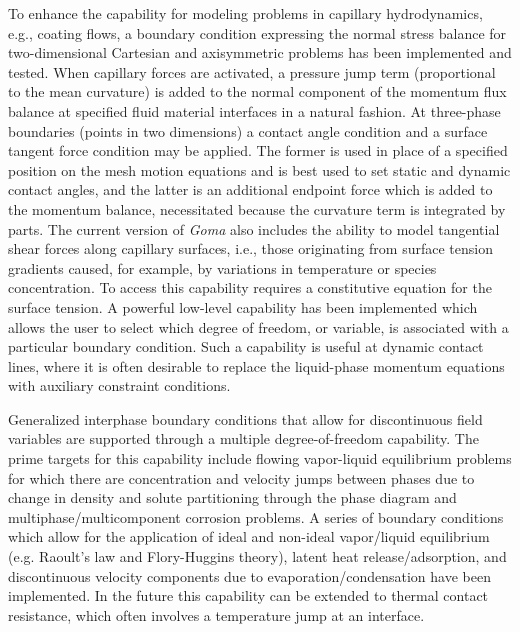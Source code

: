 To enhance the capability for modeling problems in capillary hydrodynamics, e.g., coating flows, a boundary condition expressing the normal stress balance for two-dimensional Cartesian and axisymmetric problems has been implemented and tested. When capillary forces are activated, a pressure jump term (proportional to the mean curvature) is added to the normal component of the momentum flux balance at specified fluid material interfaces in a natural fashion. At three-phase boundaries (points in two dimensions) a contact angle condition and a surface tangent force condition may be applied. The former is used in place of a specified position on the mesh motion equations and is best used to set static and dynamic contact angles, and the latter is an additional endpoint force which is added to the momentum balance, necessitated because the curvature term is integrated by parts. The current version of \emph{Goma} also includes the ability to model tangential shear forces along capillary surfaces, i.e., those originating from surface tension gradients caused, for example, by variations in temperature or species concentration. To access this capability requires a constitutive equation for the surface tension. A powerful low-level capability has been implemented which allows the user to select which degree of freedom, or variable, is associated with a particular boundary condition. Such a capability is useful at dynamic contact lines, where it is often desirable to replace the liquid-phase momentum equations with auxiliary constraint conditions.

Generalized interphase boundary conditions that allow for discontinuous field variables are supported through a multiple degree-of-freedom capability. The prime targets for this capability include flowing vapor-liquid equilibrium problems for which there are concentration and velocity jumps between phases due to change in density and solute partitioning through the phase diagram and multiphase/multicomponent corrosion problems. A series of boundary conditions which allow for the application of ideal and non-ideal vapor/liquid equilibrium (e.g. Raoult’s law and Flory-Huggins theory), latent heat release/adsorption, and discontinuous velocity components due to evaporation/condensation have been implemented. In the future this capability can be extended to thermal contact resistance, which often involves a temperature jump at an interface.

